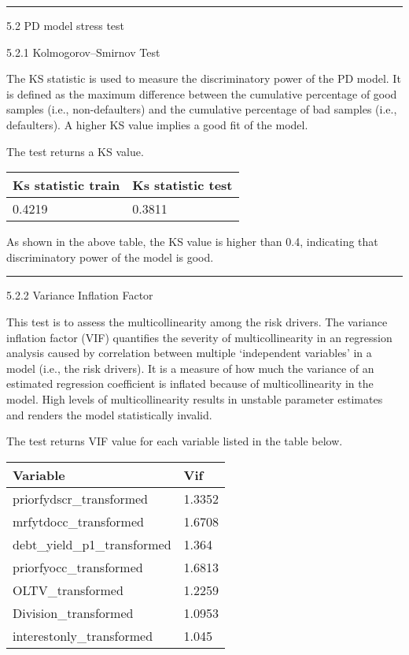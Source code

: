 \begin{center}\rule{0.5\linewidth}{\linethickness}\end{center}

5.2 PD model stress test

5.2.1 Kolmogorov--Smirnov Test

The KS statistic is used to measure the discriminatory power of the PD
model. It is defined as the maximum difference between the cumulative
percentage of good samples (i.e., non-defaulters) and the cumulative
percentage of bad samples (i.e., defaulters). A higher KS value implies
a good fit of the model.

The test returns a KS value.

\begin{longtable}[]{@{}ll@{}}
\toprule
Ks statistic train & Ks statistic test\tabularnewline
\midrule
\endhead
0.4219 & 0.3811\tabularnewline
\bottomrule
\end{longtable}

As shown in the above table, the KS value is higher than 0.4, indicating
that discriminatory power of the model is good.

\begin{center}\rule{0.5\linewidth}{\linethickness}\end{center}

5.2.2 Variance Inflation Factor

This test is to assess the multicollinearity among the risk drivers. The
variance inflation factor (VIF) quantifies the severity of
multicollinearity in an regression analysis caused by correlation
between multiple `independent variables' in a model (i.e., the risk
drivers). It is a measure of how much the variance of an estimated
regression coefficient is inflated because of multicollinearity in the
model. High levels of multicollinearity results in unstable parameter
estimates and renders the model statistically invalid.

The test returns VIF value for each variable listed in the table below.

\begin{longtable}[]{@{}ll@{}}
\toprule
Variable & Vif\tabularnewline
\midrule
\endhead
priorfydscr\_transformed & 1.3352\tabularnewline
mrfytdocc\_transformed & 1.6708\tabularnewline
debt\_yield\_p1\_transformed & 1.364\tabularnewline
priorfyocc\_transformed & 1.6813\tabularnewline
OLTV\_transformed & 1.2259\tabularnewline
Division\_transformed & 1.0953\tabularnewline
interestonly\_transformed & 1.045\tabularnewline
\bottomrule
\end{longtable}

